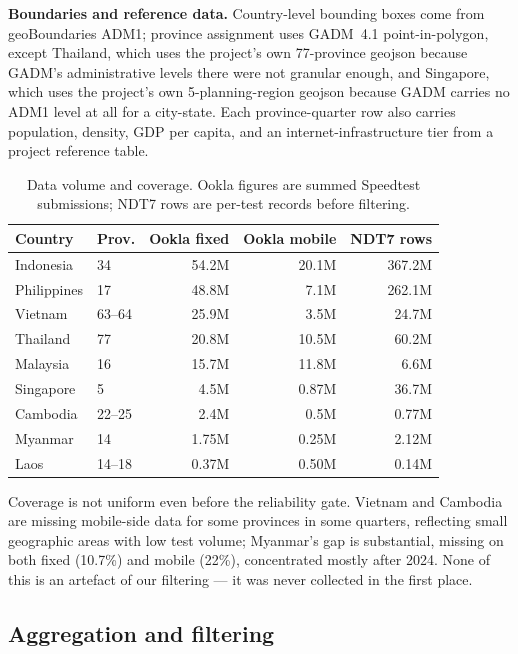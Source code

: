 \documentclass[sigconf]{acmart}
\begin{document}
\textbf{Boundaries and reference data.} Country-level bounding boxes come from geoBoundaries
ADM1; province assignment uses GADM~4.1 point-in-polygon, except Thailand, which uses the
project's own 77-province geojson because GADM's administrative levels there were not
granular enough, and Singapore, which uses the project's own 5-planning-region geojson
because GADM carries no ADM1 level at all for a city-state. Each province-quarter row also
carries population, density, GDP per capita, and an internet-infrastructure tier from a
project reference table.

\begin{table}
  \caption{Data volume and coverage. Ookla figures are summed Speedtest submissions; NDT7
    rows are per-test records before filtering.}
  \label{tab:data-volume}
  \begin{tabularx}{\textwidth}{@{}l l r r r@{}}
    \toprule
    Country & Prov. & Ookla fixed & Ookla mobile & NDT7 rows \\
    \midrule
    Indonesia    & 34      & 54.2M & 20.1M & 367.2M \\
    Philippines  & 17      & 48.8M & 7.1M  & 262.1M \\
    Vietnam      & 63--64  & 25.9M & 3.5M  & 24.7M  \\
    Thailand     & 77      & 20.8M & 10.5M & 60.2M  \\
    Malaysia     & 16      & 15.7M & 11.8M & 6.6M   \\
    Singapore    & 5       & 4.5M  & 0.87M & 36.7M  \\
    Cambodia     & 22--25  & 2.4M  & 0.5M  & 0.77M  \\
    Myanmar      & 14      & 1.75M & 0.25M & 2.12M  \\
    Laos         & 14--18  & 0.37M & 0.50M & 0.14M  \\
    \bottomrule
  \end{tabularx}
\end{table}

Coverage is not uniform even before the reliability gate. Vietnam and Cambodia are missing
mobile-side data for some provinces in some quarters, reflecting small geographic areas
with low test volume; Myanmar's gap is substantial, missing on both fixed (10.7\%) and
mobile (22\%), concentrated mostly after 2024. None of this is an artefact of our
filtering --- it was never collected in the first place.

\subsection{Aggregation and filtering}
\end{document}
